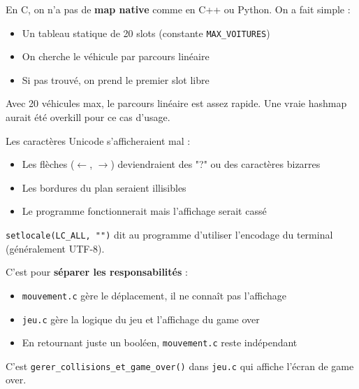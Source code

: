 \documentclass[11pt,a4paper]{article}
\newcommand{\keyword}[1]{\textcolor{primary}{\textbf{#1}}}
\newcommand{\code}[1]{\texttt{\textcolor{accent}{#1}}}
\begin{document}
\begin{reponsebox}
En C, on n'a pas de \keyword{map native} comme en C++ ou Python. On a fait simple :
\begin{itemize}[noitemsep]
    \item Un tableau statique de 20 slots (constante \code{MAX\_VOITURES})
    \item On cherche le véhicule par parcours linéaire
    \item Si pas trouvé, on prend le premier slot libre
\end{itemize}
Avec 20 véhicules max, le parcours linéaire est assez rapide. Une vraie hashmap aurait été overkill pour ce cas d'usage.
\end{reponsebox}

\vspace{0.3cm}

\begin{questionbox}
\end{questionbox}

\begin{reponsebox}
Les caractères Unicode s'afficheraient mal :
\begin{itemize}[noitemsep]
    \item Les flèches ($\leftarrow$, $\rightarrow$) deviendraient des "?" ou des caractères bizarres
    \item Les bordures du plan seraient illisibles
    \item Le programme fonctionnerait mais l'affichage serait cassé
\end{itemize}
\code{setlocale(LC\_ALL, "")} dit au programme d'utiliser l'encodage du terminal (généralement UTF-8).
\end{reponsebox}

\vspace{0.3cm}

\begin{questionbox}
\end{questionbox}

\begin{reponsebox}
C'est pour \keyword{séparer les responsabilités} :
\begin{itemize}[noitemsep]
    \item \code{mouvement.c} gère le déplacement, il ne connaît pas l'affichage
    \item \code{jeu.c} gère la logique du jeu et l'affichage du game over
    \item En retournant juste un booléen, \code{mouvement.c} reste indépendant
\end{itemize}
C'est \code{gerer\_collisions\_et\_game\_over()} dans \code{jeu.c} qui affiche l'écran de game over.
\end{reponsebox}
\end{document}
